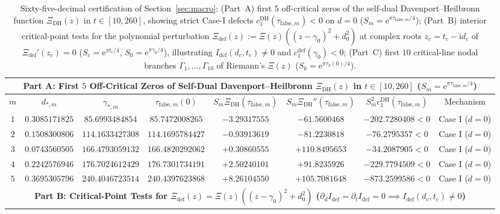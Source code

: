 \documentclass[11pt,reqno]{amsart}
\theoremstyle{definition}
\theoremstyle{remark}
\numberwithin{equation}{section}
\newcommand{\ii}{\mathrm{i}}
\newcommand{\ee}{\mathrm{e}}
\newcommand{\DHf}{\mathrm{DH}}
\newcommand{\defm}{\mathrm{def}}
\begin{document}
\begin{table}[htbp]
\centering
\caption{Sixty-five-decimal certification of Section~\ref{sec:macro}: (Part~A) first $5$ off-critical zeros of the self-dual Davenport--Heilbronn function $\Xi_{\DHf}(z)$ in $t \in [10,260]$, showing strict Case-I defects $c_1^{\DHf}(\tau_{\mathrm{false},m}) < 0$ on $d=0$ ($S_m = \ee^{\pi\tau_{\mathrm{false},m}/4}$); (Part~B) interior critical-point tests for the polynomial perturbation $\Xi_{\defm}(z) := \Xi(z)((z-\gamma_0)^2 + d_0^2)$ at complex roots $z_c = t_c - \ii d_c$ of $\Xi_{\defm}'(z_c)=0$ ($S_c = \ee^{\pi t_c/4}$, $S_0 = \ee^{\pi\gamma_0/4}$), illustrating $I_{\defm}(d_c,t_c) \ne 0$ and $c_1^{\defm}(\gamma_0) < 0$; (Part~C) first $10$ critical-line nodal branches $\Gamma_1,\dots,\Gamma_{10}$ of Riemann's $\Xi(z)$ ($S_k = \ee^{\pi\tau_k(0)/4}$).}
\label{tab:macro-certification}
\tiny
\setlength{\tabcolsep}{1.5pt}
\renewcommand{\arraystretch}{1.14}
\begin{tabular}{@{}cccccccc@{}}
\toprule
\multicolumn{8}{c}{\textbf{Part A: First $5$ Off-Critical Zeros of Self-Dual Davenport--Heilbronn $\Xi_{\DHf}(z)$ in $t \in [10,260]$ ($S_m = \ee^{\pi\tau_{\mathrm{false},m}/4}$)}} \\
\midrule
$m$ & $d_{*,m}$ & $\gamma_{*,m}$ & $\tau_{\mathrm{false},m}(0)$ & $S_m\Xi_{\DHf}(\tau_{\mathrm{false},m})$ & $S_m\Xi_{\DHf}''(\tau_{\mathrm{false},m})$ & $S_m^2 c_1^{\DHf}(\tau_{\mathrm{false},m})$ & Mechanism \\
\midrule
$1$ & $0.3085171825$ & $85.6993484854$ & $85.7472008265$ & $-3.29317555$ & $-61.5600468$ & $-202.7280408 < 0$ & Case I ($d=0$) \\
$2$ & $0.1508300806$ & $114.1633427308$ & $114.1695784427$ & $-0.93913619$ & $-81.2230818$ & $-76.2795357 < 0$ & Case I ($d=0$) \\
$3$ & $0.0743560505$ & $166.4793059132$ & $166.4820292062$ & $+0.30860555$ & $+110.8495653$ & $-34.2087905 < 0$ & Case I ($d=0$) \\
$4$ & $0.2242576946$ & $176.7024612429$ & $176.7301734191$ & $+2.50240101$ & $+91.8235926$ & $-229.7794509 < 0$ & Case I ($d=0$) \\
$5$ & $0.3695305796$ & $240.4046723514$ & $240.4397623868$ & $+8.26104550$ & $+105.7081648$ & $-873.2599586 < 0$ & Case I ($d=0$) \\
\midrule
\multicolumn{8}{c}{\textbf{Part B: Critical-Point Tests for $\Xi_{\defm}(z) = \Xi(z)((z-\gamma_0)^2 + d_0^2)$ ($\partial_d I_{\defm} = \partial_t I_{\defm} = 0 \implies I_{\defm}(d_c,t_c) \ne 0$)}} \\

\end{tabular}
\end{table}
\end{document}
